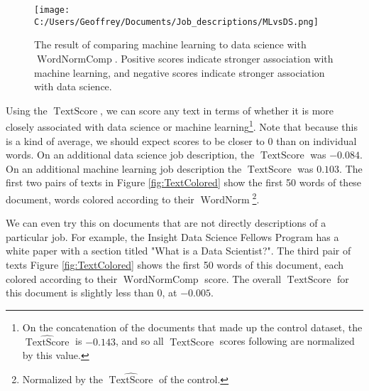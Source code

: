 \documentclass[12pt]{article}
\DeclareMathOperator{\WN}{WordNorm}
\DeclareMathOperator{\WNp}{WordNormComp}
\DeclareMathOperator{\TS}{TextScore}
\begin{document}
\begin{figure}[h]
\begin{center}
\texttt{[image: C:/Users/Geoffrey/Documents/Job\_descriptions/MLvsDS.png]}
\end{center}
\caption{\label{fig:WNp} The result of comparing machine learning to data science with $\WNp$. Positive scores indicate stronger association with machine learning, and negative scores indicate stronger association with data science.}
\end{figure}

Using the $\TS$, we can score any text in terms of whether it is more closely associated with data science or machine learning\footnote{On the concatenation of the documents that made up the control dataset, the $\widehat{\TS}$ is $-0.143$, and so all $\TS$ scores following are normalized by this value.}. Note that because this is a kind of average, we should expect scores to be closer to 0 than on individual words. On an additional data science job description, the $\TS$ was $-0.084$. On an additional machine learning job description the $\TS$ was $0.103$. The first two pairs of texts in Figure \ref{fig:TextColored} show the first 50 words of these document, words colored according to their $\WN$\footnote{Normalized by the $\widehat{\TS}$ of the control.}.

We can even try this on documents that are not directly descriptions of a particular job. For example, the Insight Data Science Fellows Program has a white paper with a section titled "What is a Data Scientist?"\cite{InsightWP}. The third pair of texts Figure \ref{fig:TextColored} shows the first 50 words of this document, each colored according to their $\WNp$ score. The overall $\TS$ for this document is slightly less than 0, at $-0.005$.
\end{document}
